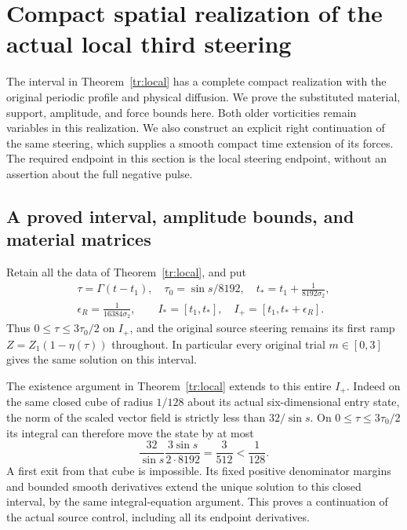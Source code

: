 \section{Compact spatial realization of the actual local third steering}
\label{trls:section}

The interval in Theorem~\ref{tr:local} has a complete compact
realization with the original periodic profile and physical diffusion.
We prove the substituted material, support, amplitude, and force
bounds here. Both older vorticities remain variables in this
realization. We also construct an explicit right continuation of the
same steering, which supplies a smooth compact time extension of its
forces. The required endpoint in this section is the local steering
endpoint, without an assertion about the full negative pulse.

\subsection{A proved interval, amplitude bounds, and material matrices}

Retain all the data of Theorem~\ref{tr:local}, and put
\begin{equation}\label{trls:times}
 \begin{gathered}
 \tau=\Gamma(t-t_1),\quad \tau_0=\sin s/8192,\quad
 t_*=t_1+\frac1{8192\sigma_2},\\
 \epsilon_R=\frac1{16384\sigma_2},\qquad
 I_*=[t_1,t_*],\quad I_+=[t_1,t_*+\epsilon_R].
 \end{gathered}
\end{equation}
Thus $0\leq\tau\leq3\tau_0/2$ on $I_+$, and the
original source steering remains its first ramp
$Z=Z_1(1-\eta(\tau))$ throughout. In particular every original
trial $m\in[0,3]$ gives the same solution on this interval.

The existence argument in Theorem~\ref{tr:local} extends to
this entire $I_+$. Indeed on the same closed cube of radius
$1/128$ about its actual six-dimensional entry state, the norm of
the scaled vector field is strictly less than $32/\sin s$.
On $0\leq\tau\leq3\tau_0/2$ its integral can therefore
move the state by at most
\[
 \frac{32}{\sin s}\frac{3\sin s}{2\cdot8192}
     =\frac3{512}<\frac1{128}.
\]
A first exit from that cube is impossible. Its fixed positive
denominator margins and bounded smooth derivatives extend the
unique solution to this closed interval, by the same integral-equation
argument. This proves a continuation of the actual source control,
including all its endpoint derivatives.

